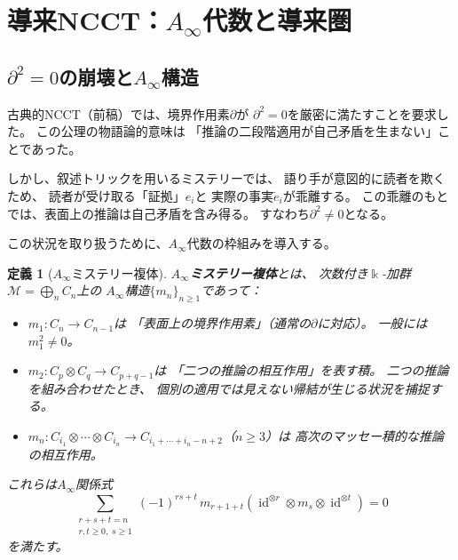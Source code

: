 \documentclass[12pt,twocolumn]{ltjsarticle}
\newtheorem{definition}[theorem]{定義}
\newcommand{\id}{\operatorname{id}}
\newcommand{\Mys}{\mathcal{M}}
\newcommand{\kk}{\Bbbk}
\begin{document}
\section{導来NCCT：$A_\infty$代数と導来圏}
\label{sec:derived}

\subsection{$\partial^2 = 0$の崩壊と$A_\infty$構造}

古典的NCCT（前稿）では、境界作用素$\partial$が
$\partial^2 = 0$を厳密に満たすことを要求した。
この公理の物語論的意味は
「推論の二段階適用が自己矛盾を生まない」ことであった。

しかし、叙述トリックを用いるミステリーでは、
語り手が意図的に読者を欺くため、
読者が受け取る「証拠」$e_i$と
実際の事実$\tilde{e}_i$が乖離する。
この乖離のもとでは、表面上の推論は自己矛盾を含み得る。
すなわち$\partial^2 \neq 0$となる。

この状況を取り扱うために、$A_\infty$代数の枠組みを導入する。

\begin{definition}[$A_\infty$ミステリー複体]
\label{def:ainfty_mystery}
\textbf{$A_\infty$ミステリー複体}とは、
次数付き$\kk$-加群$\Mys = \bigoplus_n C_n$上の
$A_\infty$構造$\{m_n\}_{n \geq 1}$であって：
\begin{itemize}
\item $m_1: C_n \to C_{n-1}$は
「表面上の境界作用素」（通常の$\partial$に対応）。
一般には$m_1^2 \neq 0$。

\item $m_2: C_p \otimes C_q \to C_{p+q-1}$は
「二つの推論の\emph{相互作用}」を表す積。
二つの推論を組み合わせたとき、
個別の適用では見えない帰結が生じる状況を捕捉する。

\item $m_n: C_{i_1} \otimes \cdots \otimes C_{i_n} \to
C_{i_1 + \cdots + i_n - n + 2}$（$n \geq 3$）は
高次の\emph{マッセー積}的な推論の相互作用。
\end{itemize}
これらは$A_\infty$関係式
\begin{equation}
\sum_{\substack{r+s+t = n \\ r, t \geq 0,\; s \geq 1}}
(-1)^{rs+t}\, m_{r+1+t}
(\id^{\otimes r} \otimes m_s \otimes \id^{\otimes t}) = 0
\label{eq:ainfty_relation}
\end{equation}
を満たす。
\end{definition}
\end{document}
